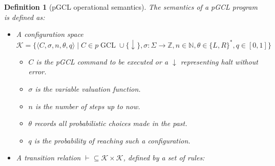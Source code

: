 \documentclass[a4paper]{article}
\newtheorem{definition}[theorem]{Definition}
\begin{document}
\begin{definition}[pGCL operational semantics]\label{def:pgcl-sem}
	The semantics of a pGCL program is defined as:
	\begin{itemize}
		\item A configuration space
		      \[
			      \mathcal K = \{\langle C, \sigma, n, \theta, q\rangle \mid
			      C\in p\operatorname{GCL} \cup \{\downarrow\},
			      \sigma: \Sigma\to\mathbb{Z},
			      n\in\mathbb{N},
			      \theta\in {\{L,R\}}^\ast,
			      q\in [0,1]
			      \}
		      \]
		      \begin{itemize}
			      \item \(C\) is the pGCL command to be executed or a \(\downarrow\) representing halt without error.
			      \item \(\sigma\) is the variable valuation function.
			      \item \(n\) is the number of steps up to now.
			      \item \(\theta\) records all probabilistic choices made in the past.
			      \item \(q\) is the probability of reaching such a configuration.
		      \end{itemize}
		\item A transition relation \(\vdash \subseteq \mathcal{K}\times \mathcal{K}\), defined by a set of rules:
\end{itemize}
\end{definition}
\end{document}
